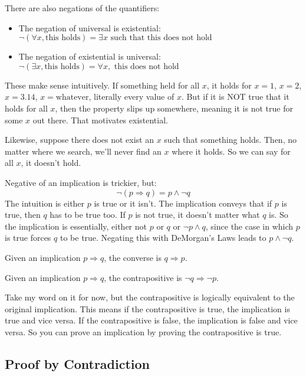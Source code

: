 \documentclass[11pt]{scrartcl}
\begin{document}
There are also negations of the quantifiers:
\begin{itemize}
    \item The negation of universal is existential: $\neg(\forall x, \text{this holds}) = \exists x \text{ such that this does not hold}$
    \item The negation of existential is universal: $\neg(\exists x, \text{this holds}) = \forall x, \text{ this does not hold}$ 
\end{itemize}
These make sense intuitively. If something held for all $x$, it holds for $x = 1$, $x = 2$, $x = 3.14$, $x = \text{whatever}$, literally every value of $x$. But if it is NOT true that it holds for all $x$, then the property slips up somewhere, meaning it is not true for some $x$ out there. That motivates existential.

Likewise, suppose there does not exist an $x$ such that something holds. Then, no matter where we search, we'll never find an $x$ where it holds. So we can say for all $x$, it doesn't hold.

Negative of an implication is trickier, but: \[\neg(p \Rightarrow q) = p \wedge \neg q\] The intuition is either $p$ is true or it isn't. The implication conveys that if $p$ is true, then $q$ has to be true too. If $p$ is not true, it doesn't matter what $q$ is. So the implication is essentially, either not $p$ or $q$ or $\neg p \wedge q$, since the case in which $p$ is true forces $q$ to be true. Negating this with DeMorgan's Laws leads to $p \wedge \neg q$.

\begin{definition}[Converse]
    Given an implication $p \Rightarrow q$, the converse is $q \Rightarrow p$.
\end{definition}

\begin{definition}[Contrapositive]
    Given an implication $p \Rightarrow q$, the contrapositive is $\neg q \Rightarrow \neg p$.
\end{definition}
Take my word on it for now, but the contrapositive is logically equivalent to the original implication. This means if the contrapositive is true, the implication is true and vice versa. If the contrapositive is false, the implication is false and vice versa. So you can prove an implication by proving the contrapositive is true.

\subsection{Proof by Contradiction}
\end{document}
